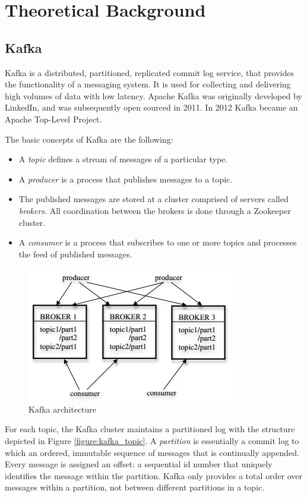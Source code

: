 \chapter{Theoretical Background}\label{chapter:theory}

\section{Kafka}\label{section:theory_kafka}

Kafka is a distributed, partitioned, replicated commit log service, that provides the functionality of a messaging system. It is used for collecting and delivering high volumes of data with low latency. Apache Kafka was originally developed by LinkedIn, and was subsequently open sourced in 2011. In 2012 Kafka became an Apache Top-Level Project.

The basic concepts of Kafka are the following:
\begin{itemize}
\item A \emph{topic} defines a stream of messages of a particular type.
\item A \emph{producer} is a process that publishes messages to a topic.
\item The published messages are stored at a cluster comprised of servers called \emph{brokers}. All coordination between the brokers is done through a Zookeeper cluster.
\item A \emph{consumer} is a process that subscribes to one or more topics and processes the feed of published messages.
\end{itemize}

\begin{figure}[H]
\centering
\includegraphics{figures/kafka_arch}
\caption{Kafka architecture}
\label{figure:kafka_arch}
\end{figure}

For each topic, the Kafka cluster maintains a partitioned log with the structure depicted in Figure \ref{figure:kafka_topic}. A \emph{partition} is essentially a commit log to which an ordered, immutable sequence of messages that is continually appended. Every message is assigned an offset: a sequential id number that uniquely identifies the message within the partition. Kafka only provides a total order over messages within a partition, not between different partitions in a topic.

